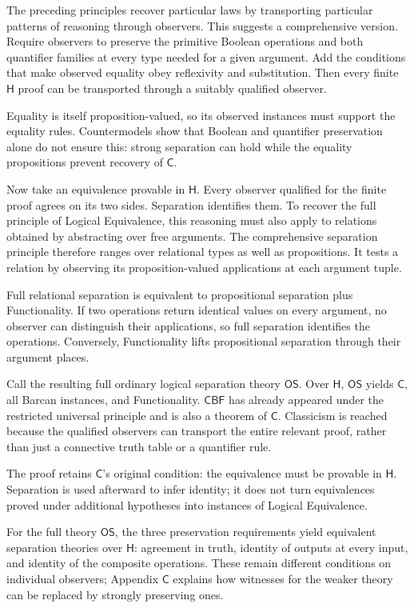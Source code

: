\documentclass[12pt,letterpaper]{article}
\newcommand{\Hlogic}{\mathsf{H}}
\newcommand{\C}{\mathsf{C}}
\newcommand{\CBF}{\mathsf{CBF}}
\newcommand{\OS}{\mathsf{OS}}
\begin{document}
The preceding principles recover particular laws by transporting particular patterns of reasoning through observers. This suggests a comprehensive version. Require observers to preserve the primitive Boolean operations and both quantifier families at every type needed for a given argument. Add the conditions that make observed equality obey reflexivity and substitution. Then every finite $\Hlogic$ proof can be transported through a suitably qualified observer.~\cite[\S3]{r6}


Equality is itself proposition-valued, so its observed instances must support the equality rules. Countermodels show that Boolean and quantifier preservation alone do not ensure this: strong separation can hold while the equality propositions prevent recovery of $\C$.~\cite[\S\S5--6]{r6}


Now take an equivalence provable in $\Hlogic$. Every observer qualified for the finite proof agrees on its two sides. Separation identifies them. To recover the full principle of Logical Equivalence, this reasoning must also apply to relations obtained by abstracting over free arguments. The comprehensive separation principle therefore ranges over relational types as well as propositions. It tests a relation by observing its proposition-valued applications at each argument tuple.


Full relational separation is equivalent to propositional separation plus Functionality. If two operations return identical values on every argument, no observer can distinguish their applications, so full separation identifies the operations. Conversely, Functionality lifts propositional separation through their argument places.~\cite[\S2]{r6}


Call the resulting full ordinary logical separation theory $\OS$. Over $\Hlogic$, $\OS$ yields $\C$, all Barcan instances, and Functionality. $\CBF$ has already appeared under the restricted universal principle and is also a theorem of $\C$. Classicism is reached because the qualified observers can transport the entire relevant proof, rather than just a connective truth table or a quantifier rule.


The proof retains $\C$'s original condition: the equivalence must be provable in $\Hlogic$. Separation is used afterward to infer identity; it does not turn equivalences proved under additional hypotheses into instances of Logical Equivalence.


For the full theory $\OS$, the three preservation requirements yield equivalent separation theories over $\Hlogic$: agreement in truth, identity of outputs at every input, and identity of the composite operations. These remain different conditions on individual observers; Appendix $\C$ explains how witnesses for the weaker theory can be replaced by strongly preserving ones.~\cite[\S4]{r6}
\end{document}
